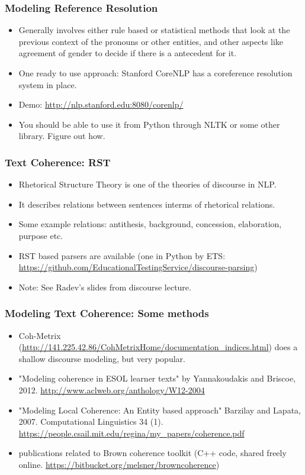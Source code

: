 \documentclass{beamer}
\begin{document}
\begin{frame}
\frametitle{Modeling Reference Resolution}
\begin{itemize}
\item Generally involves either rule based or statistical methods that look at the previous context of the pronouns or other entities, and other aspects like agreement of gender to decide if there is a antecedent for it.
\item One ready to use approach: Stanford CoreNLP has a coreference resolution system in place. 
\item Demo: \url{http://nlp.stanford.edu:8080/corenlp/}
\item You should be able to use it from Python through NLTK or some other library. Figure out how. 
\end{itemize}
\end{frame}

\begin{frame}
\frametitle{Text Coherence: RST}
\begin{itemize}
\item Rhetorical Structure Theory is one of the theories of discourse in NLP. 
\item It describes relations between sentences interms of rhetorical relations.
\item Some example relations: antithesis, background, concession, elaboration, purpose etc.
\item RST based parsers are available (one in Python by ETS: \url{https://github.com/EducationalTestingService/discourse-parsing})
\item Note: See Radev's slides from discourse lecture.
\end{itemize}
\end{frame}

\begin{frame}
\frametitle{Modeling Text Coherence: Some methods}
\begin{itemize}
\item Coh-Metrix (\url{http://141.225.42.86/CohMetrixHome/documentation_indices.html}) does a shallow discourse modeling, but very popular.
\item "Modeling coherence in ESOL learner texts" by Yannakoudakis and Briscoe, 2012. \url{http://www.aclweb.org/anthology/W12-2004}
\item "Modeling Local Coherence: An Entity based approach" Barzilay and Lapata, 2007. Computational Linguistics 34 (1). \url{https://people.csail.mit.edu/regina/my_papers/coherence.pdf}
\item publications related to Brown coherence toolkit (C++ code, shared freely online. \url{https://bitbucket.org/melsner/browncoherence})
\end{itemize}
\end{frame}
\end{document}
